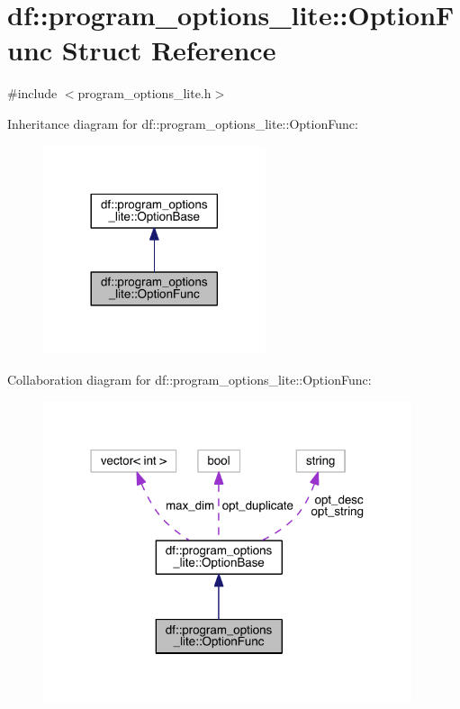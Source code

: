 \hypertarget{structdf_1_1program__options__lite_1_1_option_func}{}\section{df\+:\+:program\+\_\+options\+\_\+lite\+:\+:Option\+Func Struct Reference}
\label{structdf_1_1program__options__lite_1_1_option_func}


{\ttfamily \#include $<$program\+\_\+options\+\_\+lite.\+h$>$}



Inheritance diagram for df\+:\+:program\+\_\+options\+\_\+lite\+:\+:Option\+Func\+:
\nopagebreak
\begin{figure}[H]
\begin{center}
\leavevmode
\includegraphics[width=185pt]{dd/d17/structdf_1_1program__options__lite_1_1_option_func__inherit__graph}
\end{center}
\end{figure}


Collaboration diagram for df\+:\+:program\+\_\+options\+\_\+lite\+:\+:Option\+Func\+:
\nopagebreak
\begin{figure}[H]
\begin{center}
\leavevmode
\includegraphics[width=307pt]{d6/d22/structdf_1_1program__options__lite_1_1_option_func__coll__graph}
\end{center}
\end{figure}
